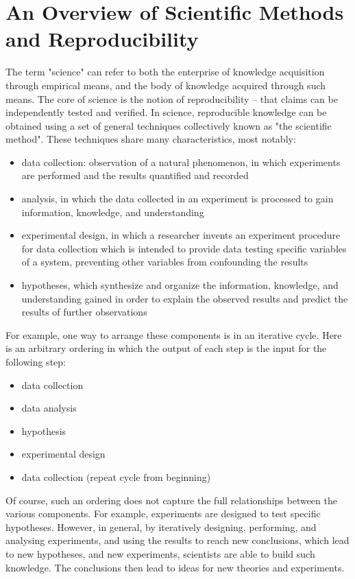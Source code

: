\section{An Overview of Scientific Methods and Reproducibility}
The term "science" can refer to both the enterprise of knowledge acquisition 
through empirical means, and the body of knowledge acquired through such means. 
The core of science is the notion of reproducibility -- that claims can be 
independently tested and verified.  In science, reproducible knowledge can be 
obtained using a set of general techniques collectively known as "the 
scientific method".  These techniques share many characteristics, most notably:
\begin{itemize}
 \item data collection: observation of a natural phenomenon, in which 
 experiments are performed and the results quantified and recorded
 \item analysis, in which the data collected in an experiment is processed to 
 gain information, knowledge, and understanding
 \item experimental design, in which a researcher invents an experiment 
 procedure for data collection which is intended to provide data testing 
 specific variables of a system, preventing other variables from confounding 
 the results
 \item hypotheses, which synthesize and organize the information, knowledge, 
 and understanding gained in order to explain the observed results and predict 
 the results of further observations
\end{itemize}

For example, one way to arrange these components is in an iterative cycle.  
Here is an arbitrary ordering in which the output of each step is the input 
for the following step:
\begin{itemize}
  \item data collection
  \item data analysis
  \item hypothesis
  \item experimental design
  \item data collection (repeat cycle from beginning)
\end{itemize}

Of course, such an ordering does not capture the full relationships between 
the various components.  For example, experiments are designed to test 
specific hypotheses.  However, in general, by iteratively designing, 
performing, and analysing experiments, and using the results to reach new 
conclusions, which lead to new hypotheses, and new experiments, scientists 
are able to build such knowledge.  The conclusions then lead to ideas for 
new theories and experiments.  

